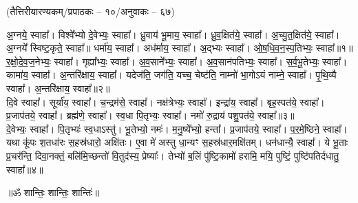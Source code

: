 
\vspace{-1ex}
\centerline{\scriptsize (तैत्तिरीयारण्यकम्/प्रपाठकः – १०/अनुवाकः – ६७)}
अ॒ग्नये॒ स्वाहा᳚। विश्वे᳚भ्यो दे॒वेभ्यः॒ स्वाहा᳚। ध्रु॒वाय॑ भू॒माय॒ स्वाहा᳚। ध्रु॒व॒क्षित॑ये॒ स्वाहा᳚। अ॒च्यु॒त॒क्षित॑ये॒ स्वाहा᳚। अ॒ग्नये᳚ स्विष्ट॒कृते॒ स्वाहा᳚॥ धर्मा॑य॒ स्वाहा᳚। अध॑र्माय॒ स्वाहा᳚। अ॒द्भ्यः स्वाहा᳚। ओ॒ष॒धि॒व॒न॒स्प॒तिभ्यः॒ स्वाहा᳚॥१॥ \\
र॒क्षो॒दे॒व॒ज॒नेभ्यः॒ स्वाहा᳚। गृह्या᳚भ्यः॒ स्वाहा᳚। अ॒व॒साने᳚भ्यः॒ स्वाहा᳚। अ॒व॒सान॑पतिभ्यः॒ स्वाहा᳚। स॒र्व॒भू॒तेभ्यः॒ स्वाहा᳚। कामा॑य॒ स्वाहा᳚। अ॒न्तरि॑क्षाय॒ स्वाहा᳚। यदेज॑ति॒ जग॑ति॒ यच्च॒ चेष्ट॑ति॒ नाम्नो॑ भा॒गोऽयं नाम्ने॒ स्वाहा᳚। पृ॒थि॒व्यै स्वाहा᳚। अ॒न्तरि॑क्षाय॒ स्वाहा᳚॥२॥ \\
दि॒वे स्वाहा᳚। सूर्या॑य॒ स्वाहा᳚। च॒न्द्रम॑से॒ स्वाहा᳚। नक्ष॑त्रेभ्यः॒ स्वाहा᳚। इन्द्रा॑य॒ स्वाहा᳚। बृह॒स्पत॑ये॒ स्वाहा᳚। प्र॒जाप॑तये॒ स्वाहा᳚। ब्रह्म॑णे॒ स्वाहा᳚। स्व॒धा पि॒तृभ्यः॒ स्वाहा᳚। नमो॑ रु॒द्राय॑ पशु॒पत॑ये॒ स्वाहा᳚॥३॥\\
  दे॒वेभ्यः॒ स्वाहा᳚। पि॒तृभ्यः॑ स्व॒धाऽस्तु॑। भू॒तेभ्यो॒ नमः॑। म॒नु॒ष्ये᳚भ्यो॒ हन्ता᳚। प्र॒जाप॑तये॒ स्वाहा᳚। प॒र॒मे॒ष्ठिने॒ स्वाहा᳚। यथा कू॑पः श॒तधा॑रः स॒हस्र॑धारो॒ अक्षि॑तः। ए॒वा मे॑ अस्तु धा॒न्यꣳ स॒हस्र॑धार॒मक्षि॑तम्। धन॑धान्यै॒ स्वाहा᳚। ये भू॒ताः प्र॒चर॑न्ति॒ दिवा॒नक्तं॒ बलि॑मि॒च्छन्तो॑ वि॒तुद॑स्य॒ प्रेष्याः᳚। तेभ्यो॑ ब॒लिं पु॑ष्टि॒कामो॑ हरामि॒ मयि॒ पुष्टिं॒ पुष्टि॑पतिर्दधातु॒ स्वाहा᳚॥४॥ 

\centerline{॥ॐ शान्तिः॒ शान्तिः॒ शान्तिः॑॥}